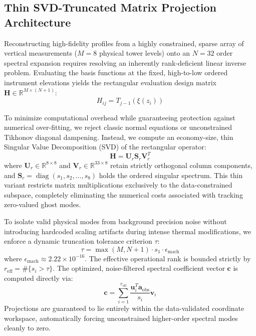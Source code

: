 \documentclass[11pt,a4paper]{article}
\begin{document}
\subsection{Thin SVD-Truncated Matrix Projection Architecture}
\label{sec:methods:svd}

Reconstructing high-fidelity profiles from a highly constrained, sparse array of vertical measurements ($M = 8$ physical tower levels) onto an $N=32$ order spectral expansion requires resolving an inherently rank-deficient linear inverse problem. Evaluating the basis functions at the fixed, high-to-low ordered instrument elevations yields the rectangular evaluation design matrix $\mathbf{H} \in \mathbb{R}^{M \times (N+1)}$:
\begin{equation}
H_{ij} = T_{j-1}(\xi(z_i))
\label{eq:h_matrix_def}
\end{equation}

To minimize computational overhead while guaranteeing protection against numerical over-fitting, we reject classic normal equations or unconstrained Tikhonov diagonal dampening. Instead, we compute an economy-size, thin Singular Value Decomposition (SVD) of the rectangular operator:
\begin{equation}
\mathbf{H} = \mathbf{U}_r \mathbf{S}_r \mathbf{V}_r^T
\label{eq:thin_svd}
\end{equation}
where $\mathbf{U}_r \in \mathbb{R}^{8 \times 8}$ and $\mathbf{V}_r \in \mathbb{R}^{33 \times 8}$ retain strictly orthogonal column components, and $\mathbf{S}_r = \operatorname{diag}(s_1, s_2, \ldots, s_8)$ holds the ordered singular spectrum. This thin variant restricts matrix multiplications exclusively to the data-constrained subspace, completely eliminating the numerical costs associated with tracking zero-valued ghost modes.

To isolate valid physical modes from background precision noise without introducing hardcoded scaling artifacts during intense thermal modifications, we enforce a dynamic truncation tolerance criterion $\tau$:
\begin{equation}
\tau = \max\left(M, N+1\right) \cdot s_1 \cdot \epsilon_{\mathrm{mach}}
\label{eq:dynamic_tolerance}
\end{equation}
where $\epsilon_{\mathrm{mach}} \approx 2.22 \times 10^{-16}$. The effective operational rank is bounded strictly by $r_{\mathrm{eff}} = \#\{s_i > \tau\}$. The optimized, noise-filtered spectral coefficient vector $\mathbf{c}$ is computed directly via:
\begin{equation}
\mathbf{c} = \sum_{i=1}^{r_{\mathrm{eff}}} \frac{\mathbf{u}_i^T \mathbf{a}_{\mathrm{obs}}}{s_i} \mathbf{v}_i
\label{eq:svd_reconstruction}
\end{equation}
Projections are guaranteed to lie entirely within the data-validated coordinate workspace, automatically forcing unconstrained higher-order spectral modes cleanly to zero.
\end{document}
